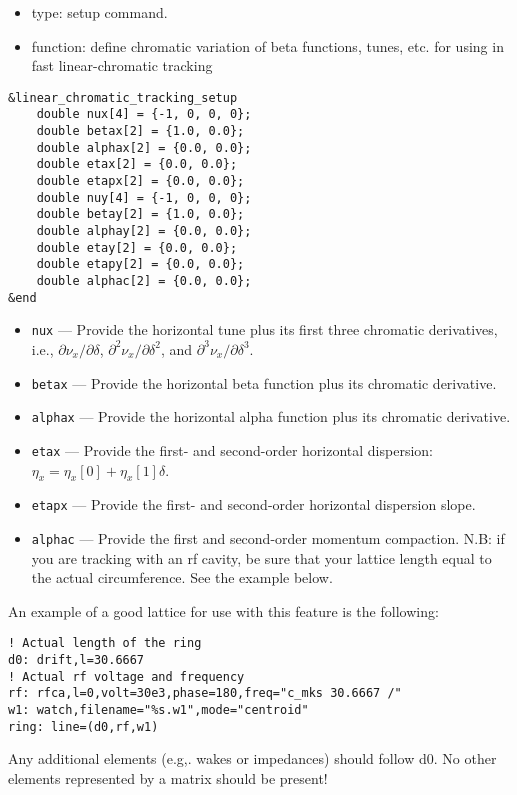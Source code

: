 \documentclass[11pt]{article}
\begin{document}
\begin{itemize}
\item type: setup command.
\item function: define chromatic variation of beta functions, tunes, etc. for using in
 fast linear-chromatic tracking
\end{itemize}

\begin{verbatim}
&linear_chromatic_tracking_setup
    double nux[4] = {-1, 0, 0, 0};
    double betax[2] = {1.0, 0.0};
    double alphax[2] = {0.0, 0.0};
    double etax[2] = {0.0, 0.0};
    double etapx[2] = {0.0, 0.0};
    double nuy[4] = {-1, 0, 0, 0};
    double betay[2] = {1.0, 0.0};
    double alphay[2] = {0.0, 0.0};
    double etay[2] = {0.0, 0.0};
    double etapy[2] = {0.0, 0.0};
    double alphac[2] = {0.0, 0.0};
&end
\end{verbatim}

\begin{itemize}
\item \verb|nux| --- Provide the horizontal tune plus its first three chromatic derivatives, i.e.,
  $\partial \nu_x/\partial\delta$, $\partial^2 \nu_x/\partial\delta^2$, and
  $\partial^3 \nu_x/\partial\delta^3$.
\item \verb|betax| --- Provide the horizontal beta function plus its chromatic derivative.
\item \verb|alphax| --- Provide the horizontal alpha function plus its chromatic derivative.
\item \verb|etax| --- Provide the first- and second-order horizontal dispersion:
  $\eta_x = \eta_x\left[0\right] + \eta_x\left[1\right]\delta$.
\item \verb|etapx| --- Provide the first- and second-order horizontal dispersion slope.
\item \verb|alphac| --- Provide the first and second-order momentum compaction.  N.B: if you are tracking
 with an rf cavity, be sure that your lattice length equal to the actual circumference.  See the example below.
\end{itemize}

An example of a good lattice for use with this feature is the following:
\begin{verbatim}
! Actual length of the ring
d0: drift,l=30.6667
! Actual rf voltage and frequency
rf: rfca,l=0,volt=30e3,phase=180,freq="c_mks 30.6667 /"
w1: watch,filename="%s.w1",mode="centroid"
ring: line=(d0,rf,w1)
\end{verbatim}
Any additional elements (e.g,. wakes or impedances) should follow d0.  No other elements represented by a matrix
should be present!
\end{document}
